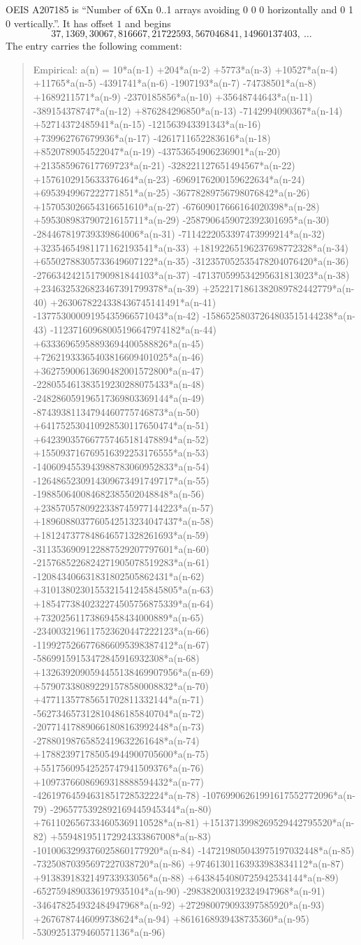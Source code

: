 \documentclass[11pt,a4paper]{article}
\theoremstyle{plain}
\theoremstyle{definition}
\begin{document}
OEIS A207185 is ``Number of 6Xn 0..1 arrays avoiding 0 0 0 horizontally and 0 1 0 vertically.''. It has offset
$1$ and begins
\[
37, 1369, 30067, 816667, 21722593, 567046841, 14960137403,\ \dots
\]
The entry carries the following comment:
\begin{quote}\small
Empirical: a(n) = 10*a(n-1) +204*a(n-2) +5773*a(n-3) +10527*a(n-4) +11765*a(n-5) -4391741*a(n-6) -1907193*a(n-7) -74738501*a(n-8) +1689211571*a(n-9) -2370185856*a(n-10) +35648744643*a(n-11) -389154378747*a(n-12) +876284296850*a(n-13) -7142994090367*a(n-14) +52714372485941*a(n-15) -121563943391343*a(n-16) +739962767679936*a(n-17) -4261711652283616*a(n-18) +8520789054522047*a(n-19) -43753654906236901*a(n-20) +213585967617769723*a(n-21) -328221127651494567*a(n-22) +1576102915633376464*a(n-23) -6969176200159622634*a(n-24) +6953949967222771851*a(n-25) -36778289756798076842*a(n-26) +157053026654316651610*a(n-27) -67609017666164020398*a(n-28) +595308983790721615711*a(n-29) -2587906459072392301695*a(n-30) -284467819739339864006*a(n-31) -7114222053397473999214*a(n-32) +32354654981171162193541*a(n-33) +18192265196237698772328*a(n-34) +65502788305733649607122*a(n-35) -312357052535478204076420*a(n-36) -276634242151790981844103*a(n-37) -471370599534295631813023*a(n-38) +2346325326823467391799378*a(n-39) +2522171861382089782442779*a(n-40) +2630678224338436745141491*a(n-41) -13775300009195435966571043*a(n-42) -15865258037264803515144238*a(n-43) -11237160968005196647974182*a(n-44) +63336965958893694400588826*a(n-45) +72621933365403816609401025*a(n-46) +36275900613690482001572800*a(n-47) -228055461383519230288075433*a(n-48) -248286059196517369803369144*a(n-49) -87439381134794460775746873*a(n-50) +641752530410928530117650474*a(n-51) +642390357667757465181478894*a(n-52) +155093716769516392253176555*a(n-53) -1406094553943988783060952833*a(n-54) -1264865230914309673491749717*a(n-55) -198850640084682385502048848*a(n-56) +2385705780922338745977144223*a(n-57) +1896088037760542513234047437*a(n-58) +181247377848646571328261693*a(n-59) -3113536909122887529207797601*a(n-60) -2157685226824271905078519283*a(n-61) -120843406631831802505862431*a(n-62) +3101380230155321541245845805*a(n-63) +1854773840232274505756875339*a(n-64) +73202561173869458434000889*a(n-65) -2340032196117523620447222123*a(n-66) -1199275266776866095398387412*a(n-67) -58699159153472845916932308*a(n-68) +1326392090594455138469907956*a(n-69) +579073380892291578580008832*a(n-70) +47711357785651702811332144*a(n-71) -562734657312810486185840704*a(n-72) -207714178890661808163992448*a(n-73) -27880198765852419632261648*a(n-74) +178823971785054944900705600*a(n-75) +55175609542525747941509376*a(n-76) +10973766086969318888594432*a(n-77) -42619764594631851728532224*a(n-78) -10769906261991617552772096*a(n-79) -2965775392892169445945344*a(n-80) +7611026567334605369110528*a(n-81) +1513713998269529442795520*a(n-82) +559481951172924333867008*a(n-83) -1010063299376025860177920*a(n-84) -147219805043975197032448*a(n-85) -73250870395697227038720*a(n-86) +97461301163933983834112*a(n-87) +9138391832149733933056*a(n-88) +6438454080725942534144*a(n-89) -6527594890336197935104*a(n-90) -298382003192324947968*a(n-91) -346478254932484947968*a(n-92) +272980079093397585920*a(n-93) +2676787446099738624*a(n-94) +8616168939438735360*a(n-95) -5309251379460571136*a(n-96)
\end{quote}
\end{document}
